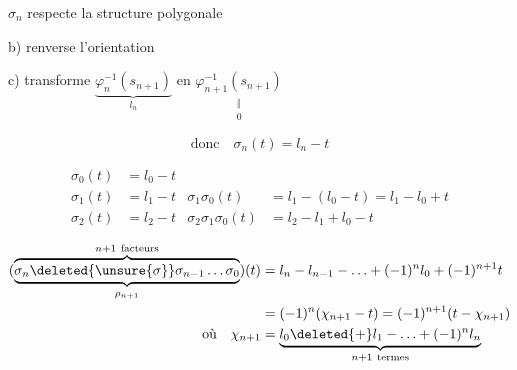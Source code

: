 

$\sigma_n$ \quad {} respecte la structure polygonale

b) renverse l'orientation

c) transforme $\underbrace{\varphi_n^{-1}(s_{n+1})}_{l_n}$ en $\underset{\substack{\Vert\\0}}{\varphi_{n+1}^{-1}(s_{n+1})}$

\[ \text{donc}\quad \sigma_n(t)=l_n-t \]

\[ \begin{aligned}
\sigma_0(t)&=l_0-t\\
\sigma_1(t)&=l_1-t &\sigma_1\sigma_0(t)&=l_1-(l_0-t)=l_1-l_0+t\\
\sigma_2(t)&=l_2-t &\sigma_2\sigma_1\sigma_0(t)&=l_2-l_1+l_0-t
\end{aligned} \]

\[ \begin{aligned}
(\underbrace{\overbrace{\sigma_n\deleted{\unsure{\sigma}}\sigma_{n-1}\ldots\sigma_0}^{n+1\ \text{facteurs}}}_{\rho_{n+1}})(t)&=l_n-l_{n-1}-\ldots+(-1)^n l_0+(-1)^{n+1}t\\
&=(-1)^n(\chi_{n+1}-t)=(-1)^{n+1}(t-\chi_{n+1})\\
\text{où}\quad \chi_{n+1}&=\underbrace{l_0\deleted{+}l_1-\ldots+(-1)^n l_n}_{n+1\ \text{termes}}
\end{aligned} \]
